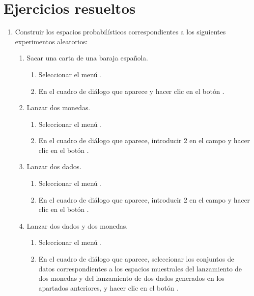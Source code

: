 \section{Ejercicios resueltos}
\begin{enumerate}[leftmargin=*] 
\item Construir los espacios probabilísticos correspondientes a los siguientes experimentos aleatorios:
\begin{enumerate}
\item Sacar una carta de una baraja española.
\begin{indicacion}
\begin{enumerate}
\item Seleccionar el menú .
\item En el cuadro de diálogo que aparece y hacer clic en el botón . 
\end{enumerate}
\end{indicacion}
\item Lanzar dos monedas.
\begin{indicacion}
\begin{enumerate}
\item Seleccionar el menú .
\item En el cuadro de diálogo que aparece, introducir 2 en el campo  y hacer clic en el botón .
\end{enumerate}
\end{indicacion}

\item Lanzar dos dados.
\begin{indicacion}
\begin{enumerate}
\item Seleccionar el menú .
\item En el cuadro de diálogo que aparece, introducir 2 en el campo  y hacer clic en el botón .
\end{enumerate}
\end{indicacion}

\item Lanzar dos dados y dos monedas. 
\begin{indicacion}
\begin{enumerate}
\item Seleccionar el menú .
\item En el cuadro de diálogo que aparece, seleccionar los conjuntos de datos correspondientes a los espacios muestrales del lanzamiento de
dos monedas y del lanzamiento de dos dados generados en los apartados anteriores, y hacer clic en el botón .
\end{enumerate}
\end{indicacion}
\end{enumerate}  


\end{enumerate}
